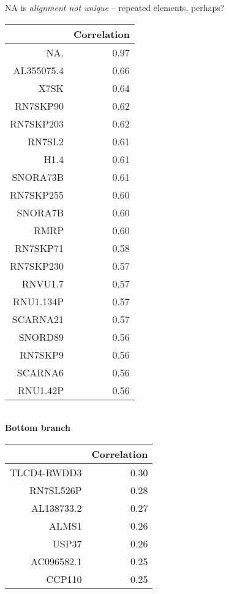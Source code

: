 \documentclass{article}
\begin{document}
NA is \emph{alignment not unique} -- repeated elements, perhaps?
\begin{center}
\begin{minipage}{.35\textwidth}
\begin{tabular}{rr}
  \hline
 & Correlation \\ 
  \hline
NA. & 0.97 \\ 
  AL355075.4 & 0.66 \\ 
  X7SK & 0.64 \\ 
  RN7SKP90 & 0.62 \\ 
  RN7SKP203 & 0.62 \\ 
  RN7SL2 & 0.61 \\ 
  H1.4 & 0.61 \\ 
  SNORA73B & 0.61 \\ 
  RN7SKP255 & 0.60 \\ 
  SNORA7B & 0.60 \\ 
  RMRP & 0.60 \\ 
  RN7SKP71 & 0.58 \\ 
  RN7SKP230 & 0.57 \\ 
  RNVU1.7 & 0.57 \\ 
  RNU1.134P & 0.57 \\ 
  SCARNA21 & 0.57 \\ 
  SNORD89 & 0.56 \\ 
  RN7SKP9 & 0.56 \\ 
  SCARNA6 & 0.56 \\ 
  RNU1.42P & 0.56 \\ 
   \hline
\end{tabular}
\\\textbf{Bottom branch}
\end{minipage}\begin{minipage}{.35\textwidth}
\begin{tabular}{rr}
  \hline
 & Correlation \\ 
  \hline
TLCD4-RWDD3 & 0.30 \\ 
  RN7SL526P & 0.28 \\ 
  AL138733.2 & 0.27 \\ 
  ALMS1 & 0.26 \\ 
  USP37 & 0.26 \\ 
  AC096582.1 & 0.25 \\ 
  CCP110 & 0.25 \\ 

\end{tabular}
\end{minipage}
\end{center}
\end{document}
